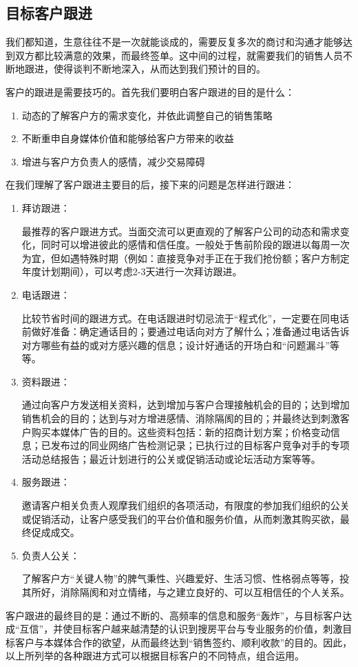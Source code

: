\subsection {目标客户跟进}

    我们都知道，生意往往不是一次就能谈成的，需要反复多次的商讨和沟通才能够达到双方都比较满意的效果，而最终签单。这中间的过程，就需要我们的销售人员不断地跟进，使得谈判不断地深入，从而达到我们预计的目的。

    客户的跟进是需要技巧的。首先我们要明白客户跟进的目的是什么：

     \begin{enumerate}
        \item 动态的了解客户方的需求变化，并依此调整自己的销售策略

        \item 不断重申自身媒体价值和能够给客户方带来的收益

        \item 增进与客户方负责人的感情，减少交易障碍
     \end{enumerate}

    在我们理解了客户跟进主要目的后，接下来的问题是怎样进行跟进：

     \begin{enumerate}
        \item 拜访跟进：

        最推荐的客户跟进方式。当面交流可以更直观的了解客户公司的动态和需求变化，同时可以增进彼此的感情和信任度。一般处于售前阶段的跟进以每周一次为宜，但如遇特殊时期（例如：直接竞争对手正在于我们抢份额；客户方制定年度计划期间），可以考虑2-3天进行一次拜访跟进。

        \item 电话跟进：

        比较节省时间的跟进方式。在电话跟进时切忌流于“程式化”，一定要在同电话前做好准备：确定通话目的；要通过电话向对方了解什么；准备通过电话告诉对方哪些有益的或对方感兴趣的信息；设计好通话的开场白和“问题漏斗”等等。

        \item 资料跟进：

        通过向客户方发送相关资料，达到增加与客户合理接触机会的目的；达到增加销售机会的目的；达到与对方增进感情、消除隔阂的目的；并最终达到刺激客户购买本媒体广告的目的。这些资料包括：新的招商计划方案；价格变动信息；已发布过的同业网络广告检测记录；已执行过的目标客户竞争对手的专项活动总结报告；最近计划进行的公关或促销活动或论坛活动方案等等。

        \item 服务跟进：

        邀请客户相关负责人观摩我们组织的各项活动，有限度的参加我们组织的公关或促销活动，让客户感受我们的平台价值和服务价值，从而刺激其购买欲，最终促成成交。

        \item 负责人公关：

        了解客户方“关键人物”的脾气秉性、兴趣爱好、生活习惯、性格弱点等等，投其所好，消除隔阂和对立情绪，与之建立良好的、可以互相信任的个人关系。
     \end{enumerate}

    客户跟进的最终目的是：通过不断的、高频率的信息和服务“轰炸”，与目标客户达成“互信”，并使目标客户越来越清楚的认识到搜房平台与专业服务的价值，刺激目标客户与本媒体合作的欲望，从而最终达到“销售签约、顺利收款”的目的。因此，以上所列举的各种跟进方式可以根据目标客户的不同特点，组合运用。
